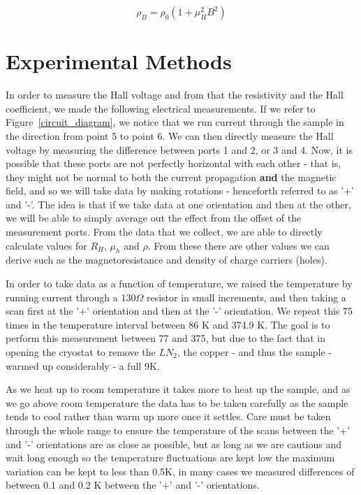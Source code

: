 \documentclass[reprint, nobibnotes, amssymb, amsmath, amsfonts, physics, mathtools, mathrsfs, floatfix]{revtex4-1}
\begin{document}
    \begin{equation}
      \rho_B = \rho_0(1 + \mu_H^2 B^2) \label{magnetoresistance}
    \end{equation}

    \section{Experimental Methods}
    In order to measure the Hall voltage and from that the resistivity and the Hall coefficient, we made the following electrical measurements.  If we refer to Figure~\ref{circuit_diagram}, we notice that we run current through the sample in the direction from point 5 to point 6.  We can then directly measure the Hall voltage by measuring the difference between ports 1 and 2, or 3 and 4.  Now, it is possible that these ports are not perfectly horizontal with each other - that is, they might not be normal to both the current propagation \textbf{and} the magnetic field, and so we will take data by making rotations - henceforth referred to as '+' and '-'.  The idea is that if we take data at one orientation and then at the other, we will be able to simply average out the effect from the offset of the measurement ports.  From the data that we collect, we are able to directly calculate values for $R_H$, $\mu_h$ and $\rho$.  From these there are other values we can derive such as the magnetoresistance and density of charge carriers (holes).

    In order to take data as a function of temperature, we raised the temperature by running current through a 130$\Omega$ resistor in small increments, and then taking a scan first at the '+' orientation and then at the '-' orientation.  We repeat this 75 times in the temperature interval between 86 K and 374.9 K.  The goal is to perform this measurement between 77 and 375, but due to the fact that in opening the cryostat to remove the $LN_2$, the copper - and thus the sample - warmed up considerably - a full 9K.

    As we heat up to room temperature it takes more to heat up the sample, and as we go above room temperature the data has to be taken carefully as the sample tends to cool rather than warm up more once it settles.  Care must be taken through the whole range to ensure the temperature of the scans between the '+' and '-' orientations are as close as possible, but as long as we are cautious and wait long enough so the temperature fluctuations are kept low the maximum variation can be kept to less than 0.5K, in many cases we measured differences of between 0.1 and 0.2 K between the '+' and '-' orientations.
\end{document}
